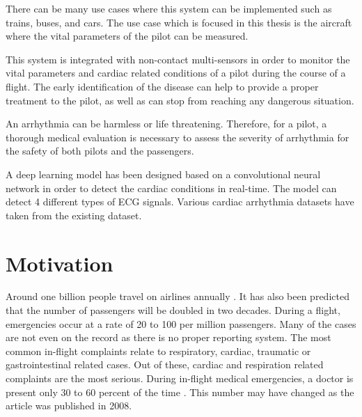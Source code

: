 There can be many use cases where this system can be implemented such as trains, buses, and cars. The use case which is focused in this thesis is the aircraft where the vital parameters of the pilot can be measured.

This system is integrated with non-contact multi-sensors in order to monitor the vital parameters and cardiac related conditions of a pilot during the course of a flight. The early identification of the disease can help to provide a proper treatment to the pilot, as well as can stop from reaching any dangerous situation.

An arrhythmia can be harmless or life threatening. Therefore, for a pilot, a thorough medical evaluation is necessary to assess the severity of arrhythmia for the safety of both pilots and the passengers.

A deep learning model has been designed based on a convolutional neural network in order to detect the cardiac conditions in real-time. The model can detect 4 different types of ECG signals. Various cardiac arrhythmia datasets have taken from the existing dataset. 



\section{Motivation}

Around one billion people travel on airlines annually \cite{PMC2577402} \cite{aerospace2003medical}. It has also been predicted that the number of passengers will be doubled in two decades. During a flight, emergencies occur at a rate of 20 to 100 per million passengers. Many of the cases are not even on the record as there is no proper reporting system. The most common in-flight complaints relate to respiratory, cardiac, traumatic or gastrointestinal related cases. Out of these, cardiac and respiration related complaints are the most serious. During in-flight medical emergencies, a doctor is present only 30 to 60 percent of the time \cite{PMC2577402} \cite{PMC1119071}. This number may have changed as the article was published in 2008.

